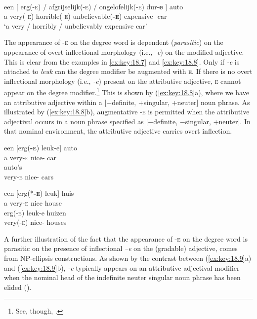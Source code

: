 \documentclass[output=paper]{langsci/langscibook}
\begin{document}
\ea%
    \label{ex:key:18.6}\\
    \gll een  [ erg(-\textsc{e})  /  afgrijselijk(\textsc{-e})  /  ongelofelijk(\textsc{-e})    dur-\textbf{e} ]                  auto\\
    a  {}    very(-\textsc{e})  {}  horrible(-\textsc{e})  {}  unbelievable(\textbf{\textsc{-e}})  expensive-\Agr{} {} car \\
    \glt ‘a very / horribly / unbelievably expensive car’
\z

The appearance of \textsc{-e} on the degree word is dependent
(\emph{parasitic}) on the appearance of overt inflectional morphology (i.e.,
\emph{-e}) on the modified adjective. This is clear from the examples in
\eqref{ex:key:18.7} and \eqref{ex:key:18.8}. Only if \emph{-e} is attached to
\emph{leuk} can the degree modifier be augmented with \textsc{e}. If there is
no overt inflectional morphology (i.e., \emph{-e}) present on the attributive
adjective, \textsc{e} cannot appear on the degree modifier.\footnote{See,
though, .} This is shown by (\ref{ex:key:18.8}a), where we
have an attributive adjective within a [−definite, +singular, +neuter] noun
phrase. As illustrated by (\ref{ex:key:18.8}b), augmentative \textsc{-e} is
permitted when the attributive adjectival occurs in a noun phrase specified as
[−definite, −singular, +neuter]. In that nominal environment, the attributive
adjective carries overt inflection.

\ea%
    \label{ex:key:18.7}
	\ea
	\gll een  [erg(\textbf{\textsc{-e}})    leuk-e]      auto\\
	         a      very-\textsc{e}      nice-\Agr{}    car \\
	    \glt
	\ex
	      auto's\\
		very-\textsc{e}    nice-\Agr{}    cars\\
	\glt
	\z
\z

\ea%
    \label{ex:key:18.8}
	\ea
	\gll een  [erg(*\textbf{\textsc{-e}})    leuk]    huis\\
	        a        very-\textsc{e}        nice      house\\
	    \glt
	\ex
	\gll erg(\textsc{-e})      leuk-e        huizen\\
		very(\textsc{-e)}    nice-\Agr{}    houses\\
	\glt
	\z
\z

A further illustration of the fact that the appearance of \textsc{-e} on the
degree word is parasitic on the presence of inflectional \emph{–e} on the
(gradable) adjective, comes from NP-ellipsis constructions. As shown by the
contrast between (\ref{ex:key:18.9}a) and (\ref{ex:key:18.9}b), \emph{-e} typically
appears on an attributive adjectival modifier when the nominal head of the
indefinite neuter singular noun phrase has been elided
(\citealt{Kester1996,CorvervanKoppen2011}).\newpage
\end{document}
